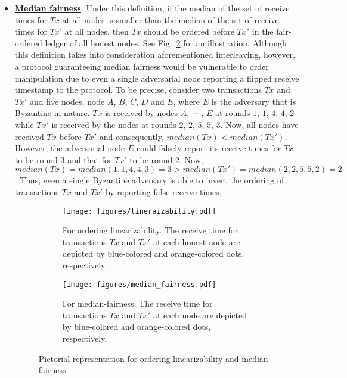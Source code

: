 \documentclass{article}
\begin{document}
\begin{itemize}
    \item \textbf{\href{https://www.swirlds.com/downloads/SWIRLDS-TR-2016-01.pdf}{Median fairness}}. Under this definition, if the median of the set of receive times for $Tx$ at all nodes is smaller than the median of the set of receive times for $Tx'$ at all nodes, then $Tx$ should be ordered before $Tx'$ in the fair-ordered ledger of all honest nodes. See Fig.~\ref{fig:median-fairness} for an illustration. Although this definition takes into consideration aforementioned interleaving, however, a protocol guaranteeing median fairness would be vulnerable to order manipulation due to even a single adversarial node reporting a flipped receive timestamp to the protocol. To be precise, consider two transactions $Tx$ and $Tx'$ and five nodes, node $A$, $B$, $C$, $D$ and $E$, where $E$ is the adversary that is Byzantine in nature. $Tx$ is received by nodes $A$, $\cdots$ , $E$ at rounds $1$, $1$, $4$, $4$, $2$ while $Tx'$ is received by the nodes at rounds $2$, $2$, $5$, $5$, $3$. Now, all nodes have received $Tx$ before $Tx'$ and consequently, $median(Tx) < median(Tx')$. However, the adversarial node $E$ could falsely report its receive times for $Tx$ to be round $3$ and that for $Tx'$ to be round $2$. Now, $median(Tx) = median(1,1,4,4,3) = 3 > median(Tx') = median(2,2,5,5,2) = 2$. Thus, even a single Byzantine adversary is able to invert the ordering of transactions $Tx$ and $Tx'$ by reporting false receive times.   
    \begin{figure}
    \centering
     \begin{subfigure}[b]{0.45\textwidth}
         \centering
         \texttt{[image: figures/lineraizability.pdf]}
         \caption{For ordering linearizability. The receive time for transactions $Tx$ and $Tx'$ at each honest node are depicted by blue-colored and orange-colored dots, respectively.}
         \label{fig:linearizability}
     \end{subfigure}
     \hfill
     \begin{subfigure}[b]{0.45\textwidth}
         \centering
         \texttt{[image: figures/median\_fairness.pdf]}
         \caption{For median-fairness. The receive time for transactions $Tx$ and $Tx'$ at each node are depicted by blue-colored and orange-colored dots, respectively.}
         \label{fig:median-fairness}
     \end{subfigure}
        \caption{ Pictorial representation for ordering linearizability and median fairness.}
        \label{fig:order-}
\end{figure}

\end{itemize}
\end{document}
